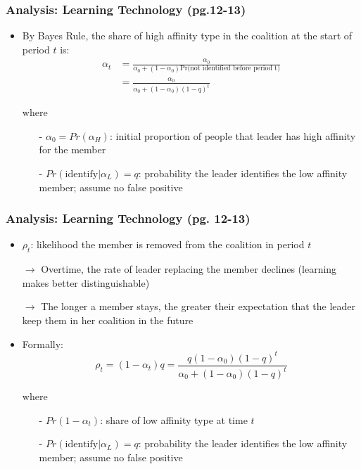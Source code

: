 \documentclass[10pt,handout]{beamer}
\begin{document}
\begin{frame}
\frametitle{Analysis: Learning Technology (pg.12-13)}
\begin{itemize}
    \item By Bayes Rule, the share of high affinity type in the coalition at the start of period $t$ is:
    \begin{align*}
        \alpha_t &= \frac{\alpha_0}{\alpha_0 + (1-\alpha_0)\text{Pr(not identified before period t)}} \\
        &= \frac{\alpha_0}{\alpha_0 + (1-\alpha_0)(1 - q)^t}
    \end{align*}
    \item[] where
    \begin{itemize}
        \item[-] $\alpha_0 = Pr(\alpha_H)$: initial proportion of people that leader has high affinity for the member
        \item[-] $Pr(\text{identify}|\alpha_L) = q$: probability the leader identifies the low affinity member; assume no false positive
    \end{itemize}
\end{itemize}
\end{frame}

\begin{frame}
\frametitle{Analysis: Learning Technology (pg. 12-13)}
\begin{itemize}
    \item $\rho_t$: likelihood the member is removed from the coalition in period $t$
    \item[] $\rightarrow$ Overtime, the rate of leader replacing the member declines (learning makes better distinguishable)
    \item[] $\rightarrow$ The longer a member stays, the greater their expectation that the leader keep them in her coalition in the future
    \item Formally:
    \[
        \rho_t = (1-\alpha_t)q = \frac{q(1-\alpha_0)(1-q)^t}{\alpha_0 + (1-\alpha_0)(1-q)^t}
    \]
    \item[] where
    \begin{itemize}
        \item[-] $Pr(1-\alpha_t)$: share of low affinity type at time $t$
        \item[-] $Pr(\text{identify}|\alpha_L) = q$: probability the leader identifies the low affinity member; assume no false positive
    \end{itemize}
\end{itemize}
\end{frame}
\end{document}
